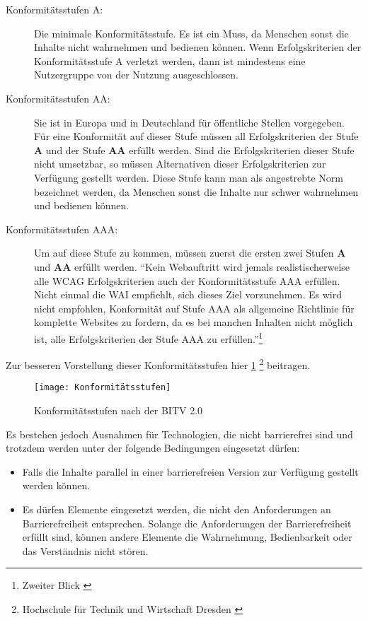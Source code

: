 \begin{description}
	\item [Konformitätsstufen A:] Die minimale Konformitätsstufe. Es ist ein Muss, da Menschen sonst die Inhalte nicht wahrnehmen und bedienen können. Wenn
	Erfolgskriterien der Konformitätsstufe A verletzt werden, dann ist mindestens eine Nutzergruppe von der Nutzung ausgeschlossen.
	
	\item [Konformitätsstufen AA:] Sie ist in Europa und in Deutschland für öffentliche Stellen vorgegeben. Für eine Konformität auf dieser Stufe 
	müssen all Erfolgskriterien der Stufe \textbf{A} und der Stufe \textbf{AA} erfüllt werden. Sind die Erfolgskriterien dieser Stufe nicht umsetzbar, so
	müssen Alternativen dieser Erfolgskriterien
	zur Verfügung gestellt werden. Diese Stufe kann man als angestrebte Norm bezeichnet werden, da Menschen sonst die Inhalte nur schwer wahrnehmen und bedienen können.
	
	\item [Konformitätsstufen AAA:] Um auf diese Stufe zu kommen, müssen zuerst die ersten zwei Stufen \textbf{A} und \textbf{AA} erfüllt werden. "`Kein 
	Webauftritt wird jemals realistischerweise alle WCAG Erfolgskriterien auch der Konformitätsstufe AAA erfüllen. Nicht einmal die WAI empfiehlt, sich 
	dieses Ziel vorzunehmen. Es wird nicht empfohlen, Konformität auf Stufe AAA als allgemeine Richtlinie für komplette Websites zu fordern, da es bei manchen
	Inhalten nicht möglich ist, alle Erfolgskriterien der Stufe AAA zu erfüllen."'\footnote{Zweiter Blick \cite{ZweiterBlick}}
\end{description}

Zur besseren Vorstellung dieser Konformitätsstufen hier \cref{fig:Konformitätsstufen} \footnote{Hochschule für Technik und Wirtschaft Dresden \cite{HV}} beitragen.

\begin{figure}[H]
	\centering
	\texttt{[image: Konformitätsstufen]}
	\caption[Konformitätsstufen nach der \ac{BITV} 2.0]{Konformitätsstufen nach der \ac{BITV} 2.0}
	\label{fig:Konformitätsstufen}
\end{figure}

\vspace{2cm}

Es bestehen jedoch Ausnahmen für Technologien, die nicht barrierefrei sind und trotzdem werden unter der folgende Bedingungen eingesetzt dürfen:
\begin{itemize}
	\item Falls die Inhalte parallel in einer barrierefreien Version zur Verfügung gestellt werden können.
	\item Es dürfen Elemente eingesetzt werden, die nicht den Anforderungen an Barrierefreiheit entsprechen. Solange die Anforderungen der Barrierefreiheit erfüllt 
	sind, können andere Elemente die Wahrnehmung, Bedienbarkeit oder das Verständnis nicht stören.
\end{itemize}

